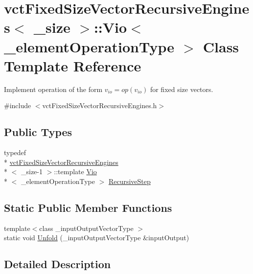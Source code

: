 \hypertarget{classvct_fixed_size_vector_recursive_engines_1_1_vio}{\section{vct\-Fixed\-Size\-Vector\-Recursive\-Engines$<$ \-\_\-size $>$\-:\-:Vio$<$ \-\_\-element\-Operation\-Type $>$ Class Template Reference}
\label{classvct_fixed_size_vector_recursive_engines_1_1_vio}
}


Implement operation of the form $v_{io} = op(v_{io})$ for fixed size vectors.  




{\ttfamily \#include $<$vct\-Fixed\-Size\-Vector\-Recursive\-Engines.\-h$>$}

\subsection*{Public Types}
\begin{DoxyCompactItemize}
\item 
typedef \\*
\hyperlink{classvct_fixed_size_vector_recursive_engines}{vct\-Fixed\-Size\-Vector\-Recursive\-Engines}\\*
$<$ \-\_\-size-\/1 $>$\-::template \hyperlink{classvct_fixed_size_vector_recursive_engines_1_1_vio}{Vio}\\*
$<$ \-\_\-element\-Operation\-Type $>$ \hyperlink{classvct_fixed_size_vector_recursive_engines_1_1_vio_ab8636d835afe64d6831799cc7ce45d27}{Recursive\-Step}
\end{DoxyCompactItemize}
\subsection*{Static Public Member Functions}
\begin{DoxyCompactItemize}
\item 
{\footnotesize template$<$class \-\_\-input\-Output\-Vector\-Type $>$ }\\static void \hyperlink{classvct_fixed_size_vector_recursive_engines_1_1_vio_a09db66b4c82e88ceb27fcec9cd0f9589}{Unfold} (\-\_\-input\-Output\-Vector\-Type \&input\-Output)
\end{DoxyCompactItemize}


\subsection{Detailed Description}
